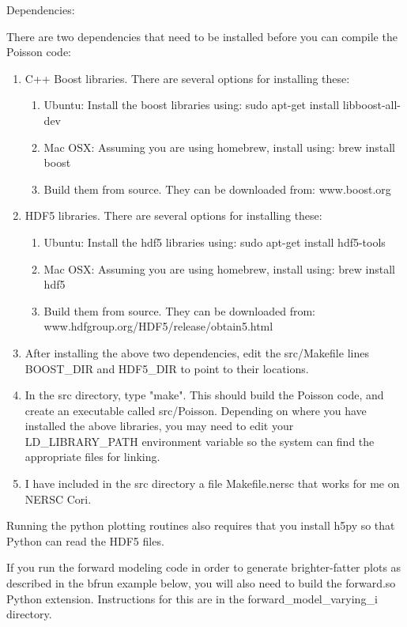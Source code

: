 \documentclass{article} %
\begin{document}
Dependencies:

There are two dependencies that need to be installed before you can compile the Poisson code:
\begin{enumerate}
  \item C++ Boost libraries.  There are several options for installing these:
    \begin{enumerate}
      \item Ubuntu: Install the boost libraries using: sudo apt-get install libboost-all-dev
      \item Mac OSX: Assuming you are using homebrew, install using: brew install boost
      \item Build them from source.  They can be downloaded from: www.boost.org
    \end{enumerate}
  \item HDF5 libraries.  There are several options for installing these:
    \begin{enumerate}
      \item Ubuntu: Install the hdf5 libraries using: sudo apt-get install hdf5-tools
      \item Mac OSX: Assuming you are using homebrew, install using: brew install hdf5
      \item Build them from source.  They can be downloaded from: www.hdfgroup.org/HDF5/release/obtain5.html
    \end{enumerate}
  \item After installing the above two dependencies, edit the src/Makefile lines  BOOST\_DIR and HDF5\_DIR to point to their locations.
  \item In the src directory, type "make".  This should build the Poisson code, and create an executable called src/Poisson. Depending on where you have installed the above libraries, you may need to edit your LD\_LIBRARY\_PATH environment variable so the system can find the appropriate files for linking.
  \item I have included in the src directory a file Makefile.nersc that works for me on NERSC Cori.
\end{enumerate}
Running the python plotting routines also requires that you install h5py so that Python can read the HDF5 files.

If you run the forward modeling code in order to generate brighter-fatter plots as described in the bfrun example below, you will also need to build the forward.so Python extension.  Instructions for this are in the forward\_model\_varying\_i directory.
\end{document}
